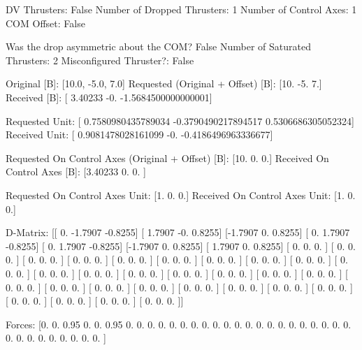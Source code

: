 DV Thrusters:	False
Number of Dropped Thrusters:	1
Number of Control Axes:	1
COM Offset:	False

Was the drop asymmetric about the COM?	False
Number of Saturated Thrusters:	2
Misconfigured Thruster?:	False

Original [B]:	[10.0, -5.0, 7.0]
Requested (Original + Offset) [B]:	[10. -5.  7.]
Received [B]:		[ 3.40233            -0.                 -1.5684500000000001]

Requested Unit:		[ 0.7580980435789034 -0.3790490217894517  0.5306686305052324]
Received Unit:		[ 0.9081478028161099 -0.                 -0.4186496963336677]

Requested On Control Axes (Original + Offset) [B]:	[10.  0.  0.]
Received On Control Axes [B]:		[3.40233 0.      0.     ]

Requested On Control Axes Unit:		[1. 0. 0.]
Received On Control Axes Unit:		[1. 0. 0.]

D-Matrix:
[[ 0.     -1.7907 -0.8255]
 [ 1.7907 -0.      0.8255]
 [-1.7907  0.      0.8255]
 [ 0.      1.7907 -0.8255]
 [ 0.      1.7907 -0.8255]
 [-1.7907  0.      0.8255]
 [ 1.7907  0.      0.8255]
 [ 0.      0.      0.    ]
 [ 0.      0.      0.    ]
 [ 0.      0.      0.    ]
 [ 0.      0.      0.    ]
 [ 0.      0.      0.    ]
 [ 0.      0.      0.    ]
 [ 0.      0.      0.    ]
 [ 0.      0.      0.    ]
 [ 0.      0.      0.    ]
 [ 0.      0.      0.    ]
 [ 0.      0.      0.    ]
 [ 0.      0.      0.    ]
 [ 0.      0.      0.    ]
 [ 0.      0.      0.    ]
 [ 0.      0.      0.    ]
 [ 0.      0.      0.    ]
 [ 0.      0.      0.    ]
 [ 0.      0.      0.    ]
 [ 0.      0.      0.    ]
 [ 0.      0.      0.    ]
 [ 0.      0.      0.    ]
 [ 0.      0.      0.    ]
 [ 0.      0.      0.    ]
 [ 0.      0.      0.    ]
 [ 0.      0.      0.    ]
 [ 0.      0.      0.    ]
 [ 0.      0.      0.    ]
 [ 0.      0.      0.    ]
 [ 0.      0.      0.    ]]

Forces:
[0.   0.   0.95 0.   0.   0.95 0.   0.   0.   0.   0.   0.   0.   0.
 0.   0.   0.   0.   0.   0.   0.   0.   0.   0.   0.   0.   0.   0.
 0.   0.   0.   0.   0.   0.   0.   0.  ]

